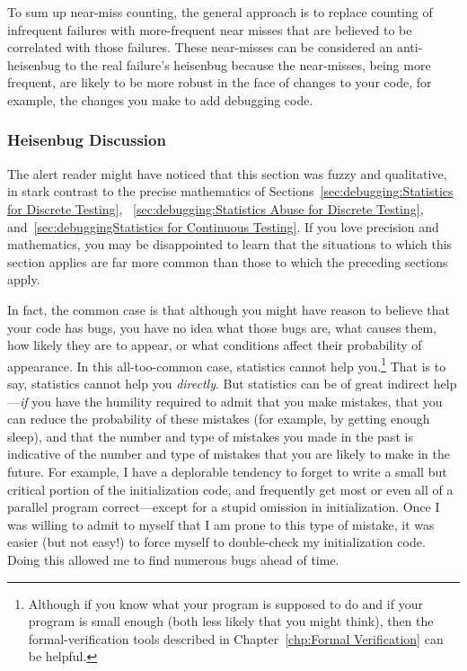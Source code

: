 To sum up near-miss counting, the general approach is to replace counting
of infrequent failures with more-frequent near misses that are believed
to be correlated with those failures.
These near-misses can be considered an anti-heisenbug to the real failure's
heisenbug because the near-misses, being more frequent, are likely to
be more robust in the face of changes to your code, for example, the
changes you make to add debugging code.

\subsubsection{Heisenbug Discussion}
\label{sec:debugging:Heisenbug Discussion}

The alert reader might have noticed that this section was fuzzy and
qualitative, in stark contrast to the precise mathematics of
Sections~\ref{sec:debugging:Statistics for Discrete Testing},
~\ref{sec:debugging:Statistics Abuse for Discrete Testing},
and~\ref{sec:debuggingStatistics for Continuous Testing}.
If you love precision and mathematics, you may be disappointed to
learn that the situations to which this section applies are far
more common than those to which the preceding sections apply.

In fact, the common case is that although you might have reason to believe
that your code has bugs, you have no idea what those bugs are, what
causes them, how likely they are to appear, or what conditions affect
their probability of appearance.
In this all-too-common case, statistics cannot help you.\footnote{
	Although if you know what your program is supposed to do and
	if your program is small enough (both less likely that you
	might think), then the formal-verification tools described in
	Chapter~\ref{chp:Formal Verification}
	can be helpful.}
That is to say, statistics cannot help you \emph{directly}.
But statistics can be of great indirect help---\emph{if} you have the
humility required to admit that you make mistakes, that you can reduce the
probability of these mistakes (for example, by getting enough sleep), and
that the number and type of mistakes you made in the past is indicative of
the number and type of mistakes that you are likely to make in the future.
For example, I have a deplorable tendency to forget to write a small
but critical portion of the initialization code, and frequently get most
or even all of a parallel program correct---except for a stupid
omission in initialization.
Once I was willing to admit to myself that I am prone to this type of
mistake, it was easier (but not easy!) to force myself to double-check
my initialization code.
Doing this allowed me to find numerous bugs ahead of time.

